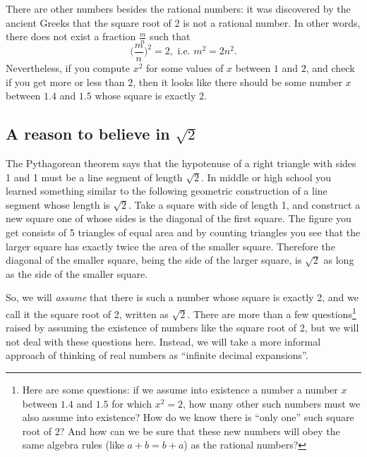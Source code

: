 There are other numbers besides the rational numbers: it was discovered by the
ancient Greeks that the square root of 2 is not a rational number.  In other
words, there does not exist a fraction $\frac{m}{n}$ such that
\[
\bigl(\frac mn\bigr)^2 = 2, \text{ i.e. }
m^2= 2n^2.
\]
Nevertheless, if you compute $x^2$ for some values of $x$ between $1$ and $2$,
and check if you get more or less than $2$, then it looks like there should be
some number $x$ between $1.4$ and $1.5$ whose square is exactly $2$.

\subsection{A reason to believe in $\sqrt2$} 
The Pythagorean theorem says that the hypotenuse of a right triangle with sides
1 and 1 must be a line segment of length $\sqrt2$.
In middle or high school you learned something similar to the following geometric
construction of a line segment whose length is $\sqrt2$.  Take a square with
side of length 1, and construct a new square one of whose sides is the diagonal
of the first square.  The figure you get consists of 5 triangles of equal area
and by counting triangles you see that the larger square  has exactly twice the
area of the smaller square.
\marginpar{\footnotesize\sffamily%
  }
Therefore the diagonal of the smaller square, being
the side of the larger square, is $\sqrt2$ as long as the side of the smaller
square.

So, we will \textit{assume} that there is such a number whose square is exactly
2, and we call it the square root of 2, written as $\sqrt2$.  There are more
than a few questions\footnote{Here are some questions: if we assume into
existence a number a number $x$ between $1.4$ and $1.5$ for which $x^2=2$, how
many other such numbers must we also assume into existence?  How do we know
there is ``only one'' such square root of 2? And how can we be sure that these
new numbers will obey the same algebra rules (like $a+b = b+a$) as the rational
numbers?} raised by assuming the existence of numbers like the square root of 2,
but we will not deal with these questions here.  Instead, we will take a more
informal approach of thinking of real numbers as ``infinite decimal
expansions''.


